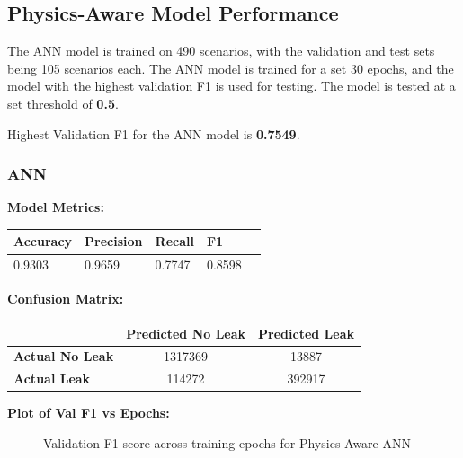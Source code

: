 \documentclass[final,5p,times,twocolumn,authoryear]{elsarticle}
\begin{document}
\subsection{Physics-Aware Model Performance}

The ANN model is trained on 490 scenarios, with the validation and test sets being 105 scenarios each. The ANN model is trained for a set 30 epochs, and the model with the highest validation F1 is used for testing. The model is tested at a set threshold of \textbf{0.5}.

Highest Validation F1 for the ANN model is \textbf{0.7549}.

\subsubsection{ANN}

\vspace{0.03cm}

\textbf{Model Metrics:}

\begin{table}[H]
\begin{tabular}{@{}lllll@{}}
\toprule
\textbf{Accuracy} & \textbf{Precision} & \textbf{Recall} & \textbf{F1} \\ \midrule
0.9303       & 0.9659        & 0.7747      & 0.8598     
\end{tabular}
\end{table}

\textbf{Confusion Matrix:}

\begin{table}[H]
\centering
\label{tab:conf_matrix}
\begin{tabular}{lcc}
\toprule
 & \textbf{Predicted No Leak} & \textbf{Predicted Leak} \\
\midrule
\textbf{Actual No Leak} & 1317369 & 13887 \\
\textbf{Actual  Leak} & 114272 & 392917 \\
\bottomrule
\end{tabular}
\end{table}

\textbf{Plot of Val F1 vs Epochs:}


\begin{figure}[H]
\centering
{}
\caption{Validation F1 score across training epochs for Physics-Aware ANN}
\label{fig:val_f1}
\end{figure}
\end{document}
